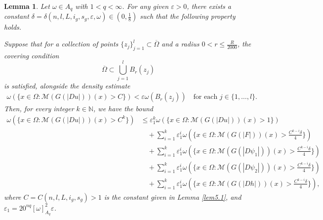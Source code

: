 \documentclass[10pt,a4paper]{article}
\newtheorem{lemma}[theorem]{Lemma}
\theoremstyle{definition}
\numberwithin{equation}{section}
\begin{document}
 
 
\begin{lemma}\label{deome}
 Let $\omega \in A_q$ with $1 < q < \infty$. For any given $\varepsilon > 0$, there exists a constant 
 $\delta = \delta(n,l,L,i_g,s_g,\varepsilon, \omega) \in \left(0, \frac{1}{8}\right)$ 
 such that the following property holds.
 
 Suppose that for a collection of points $\{z_j\}_{j=1}^l \subset \overline{\Omega}$ and a radius $0 < r \leq \frac{R}{2000}$, the covering condition
 \[
 \overline{\Omega} \subset \bigcup_{j=1}^l B_r(z_j)
 \]
 is satisfied, alongside the density estimate
 \begin{align}\label{deome1}
 	\omega(\{x \in \Omega : \mathcal{M}(G(|Du|))(x) > C\}) < \varepsilon \omega(B_r(z_j)) \quad \text{for each }
 	j\in\{1, \dots, l\}. 
 \end{align}
 Then, for every integer $k \in \mathbb{N}$, we have the bound
 \begin{align}\label{deome2}
 	\omega(\{x \in \Omega : \mathcal{M}(G(|Du|))(x) > C^k\})
 	&\leq \varepsilon_1^k \omega(\{x \in \Omega : \mathcal{M}(G(|Du|))(x) > 1\}) \nonumber\\ 
 	&\quad + \sum_{i=1}^k \varepsilon_1^i \omega(\{x \in \Omega : \mathcal{M}(G(|F|))(x) > \frac{C^{k-i}\delta}{4}\}) \nonumber\\  
 	&\quad +\sum_{i=1}^k \varepsilon_1^i \omega(\{x \in \Omega : \mathcal{M}(G(|D\psi_1|))(x) > \frac{C^{k-i}\delta}{4}\}) \nonumber\\ 
 	&\quad +\sum_{i=1}^k \varepsilon_1^i \omega(\{x \in \Omega : \mathcal{M}(G(|D\psi_2|))(x) > \frac{C^{k-i}\delta}{4}\}) \nonumber\\ 
 	&\quad +\sum_{i=1}^k \varepsilon_1^i \omega(\{x \in \Omega : \mathcal{M}(G(|Dh|))(x) > \frac{C^{k-i}\delta}{4}\}),
 \end{align}
 where $C=C(n,l,L,i_g,s_g) > 1$ is the constant given in Lemma \ref{lem5.1}, and $\varepsilon_1 = 20^{nq}[\omega]_{A_q}^2\varepsilon$.
\end{lemma}
 
\end{document}
